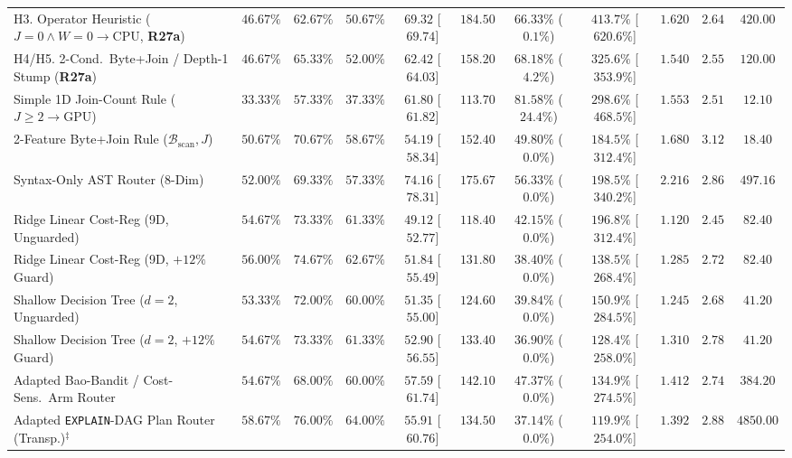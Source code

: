 \documentclass[10pt,a4paper]{article}
\newenvironment{fitasttable}{%
  \begin{lrbox}{\asttblbox}%
}{%
  \end{lrbox}%
  \sbox{\asttblboxB}{%
    \ifdim\wd\asttblbox>0.96\textwidth
      \resizebox{0.96\textwidth}{!}{\usebox{\asttblbox}}%
    \else
      \usebox{\asttblbox}%
    \fi
  }%
  \ifdim\ht\asttblboxB>0.72\textheight
    \resizebox{!}{0.72\textheight}{\usebox{\asttblboxB}}%
  \else
    \usebox{\asttblboxB}%
  \fi
}
\begin{document}
\begin{table}[!htbp]
\begin{fitasttable}
{\begin{tabular}{@{}lcccccccccc@{}}
H3. Operator Heuristic ($J=0\wedge W=0\rightarrow\text{CPU}$, \textbf{R27a}) & $46.67\%$ & $62.67\%$ & $50.67\%$ & $69.32$ [$69.74$] & $184.50$ & $66.33\%$ ($0.1\%$) & $413.7\%$ [$620.6\%$] & $1.620$ & $2.64$ & $420.00$ \\
H4/H5. 2-Cond.\ Byte+Join / Depth-1 Stump (\textbf{R27a}) & $46.67\%$ & $65.33\%$ & $52.00\%$ & $62.42$ [$64.03$] & $158.20$ & $68.18\%$ ($4.2\%$) & $325.6\%$ [$353.9\%$] & $1.540$ & $2.55$ & $120.00$ \\
Simple 1D Join-Count Rule ($J \ge 2 \rightarrow \text{GPU}$) & $33.33\%$ & $57.33\%$ & $37.33\%$ & $61.80$ [$61.82$] & $113.70$ & $81.58\%$ ($24.4\%$) & $298.6\%$ [$468.5\%$] & $1.553$ & $2.51$ & $12.10$ \\
2-Feature Byte+Join Rule ($\mathcal{B}_{\text{scan}}, J$) & $50.67\%$ & $70.67\%$ & $58.67\%$ & $54.19$ [$58.34$] & $152.40$ & $49.80\%$ ($0.0\%$) & $184.5\%$ [$312.4\%$] & $1.680$ & $3.12$ & $18.40$ \\
Syntax-Only AST Router (8-Dim) & $52.00\%$ & $69.33\%$ & $57.33\%$ & $74.16$ [$78.31$] & $175.67$ & $56.33\%$ ($0.0\%$) & $198.5\%$ [$340.2\%$] & $2.216$ & $2.86$ & $497.16$ \\
Ridge Linear Cost-Reg (9D, Unguarded) & $54.67\%$ & $73.33\%$ & $61.33\%$ & $49.12$ [$52.77$] & $118.40$ & $42.15\%$ ($0.0\%$) & $196.8\%$ [$312.4\%$] & $1.120$ & $2.45$ & $82.40$ \\
Ridge Linear Cost-Reg (9D, $+12\%$ Guard) & $56.00\%$ & $74.67\%$ & $62.67\%$ & $51.84$ [$55.49$] & $131.80$ & $38.40\%$ ($0.0\%$) & $138.5\%$ [$268.4\%$] & $1.285$ & $2.72$ & $82.40$ \\
Shallow Decision Tree ($d=2$, Unguarded) & $53.33\%$ & $72.00\%$ & $60.00\%$ & $51.35$ [$55.00$] & $124.60$ & $39.84\%$ ($0.0\%$) & $150.9\%$ [$284.5\%$] & $1.245$ & $2.68$ & $41.20$ \\
Shallow Decision Tree ($d=2$, $+12\%$ Guard) & $54.67\%$ & $73.33\%$ & $61.33\%$ & $52.90$ [$56.55$] & $133.40$ & $36.90\%$ ($0.0\%$) & $128.4\%$ [$258.0\%$] & $1.310$ & $2.78$ & $41.20$ \\
Adapted Bao-Bandit / Cost-Sens.\ Arm Router & $54.67\%$ & $68.00\%$ & $60.00\%$ & $57.59$ [$61.74$] & $142.10$ & $47.37\%$ ($0.0\%$) & $134.9\%$ [$274.5\%$] & $1.412$ & $2.74$ & $384.20$ \\
Adapted \texttt{EXPLAIN}-DAG Plan Router (Transp.)$^{\ddagger}$ & $58.67\%$ & $76.00\%$ & $64.00\%$ & $55.91$ [$60.76$] & $134.50$ & $37.14\%$ ($0.0\%$) & $119.9\%$ [$254.0\%$] & $1.392$ & $2.88$ & $4850.00$ \\

\end{tabular}}
\end{fitasttable}
\end{table}
\end{document}
